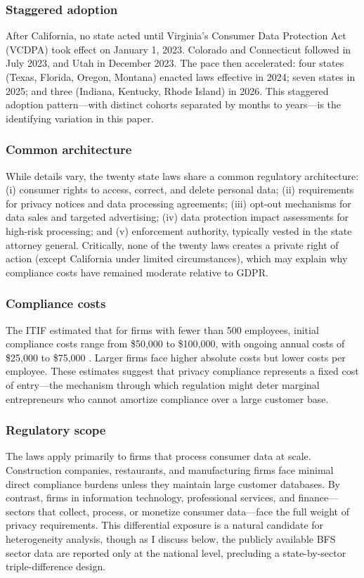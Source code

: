 \documentclass[12pt]{article}
\begin{document}
\subsubsection*{Staggered adoption} After California, no state acted until Virginia's Consumer Data Protection Act (VCDPA) took effect on January 1, 2023. Colorado and Connecticut followed in July 2023, and Utah in December 2023. The pace then accelerated: four states (Texas, Florida, Oregon, Montana) enacted laws effective in 2024; seven states in 2025; and three (Indiana, Kentucky, Rhode Island) in 2026. This staggered adoption pattern---with distinct cohorts separated by months to years---is the identifying variation in this paper.

\subsubsection*{Common architecture} While details vary, the twenty state laws share a common regulatory architecture: (i) consumer rights to access, correct, and delete personal data; (ii) requirements for privacy notices and data processing agreements; (iii) opt-out mechanisms for data sales and targeted advertising; (iv) data protection impact assessments for high-risk processing; and (v) enforcement authority, typically vested in the state attorney general. Critically, none of the twenty laws creates a private right of action (except California under limited circumstances), which may explain why compliance costs have remained moderate relative to GDPR.

\subsubsection*{Compliance costs} The ITIF estimated that for firms with fewer than 500 employees, initial compliance costs range from \$50,000 to \$100,000, with ongoing annual costs of \$25,000 to \$75,000 \citep{itif2022}. Larger firms face higher absolute costs but lower costs per employee. These estimates suggest that privacy compliance represents a fixed cost of entry---the mechanism through which regulation might deter marginal entrepreneurs who cannot amortize compliance over a large customer base.

\subsubsection*{Regulatory scope} The laws apply primarily to firms that process consumer data at scale. Construction companies, restaurants, and manufacturing firms face minimal direct compliance burdens unless they maintain large customer databases. By contrast, firms in information technology, professional services, and finance---sectors that collect, process, or monetize consumer data---face the full weight of privacy requirements. This differential exposure is a natural candidate for heterogeneity analysis, though as I discuss below, the publicly available BFS sector data are reported only at the national level, precluding a state-by-sector triple-difference design.
\end{document}
